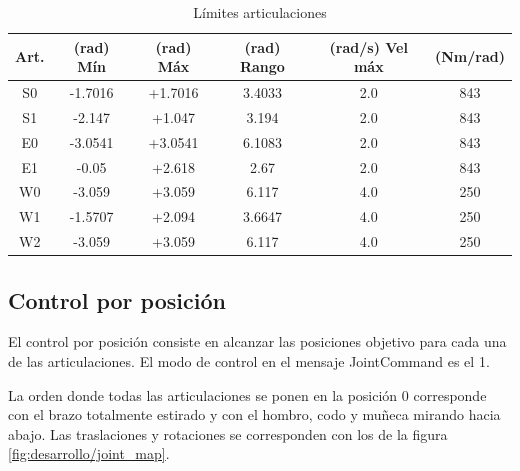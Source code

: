 \begin{table}[]
\centering
\caption{Límites articulaciones}
\label{tab:desarrollo/limits}
\begin{tabular}{cccccc}
Art.                    & (rad) Mín & (rad) Máx & (rad) Rango & (rad/s) Vel máx & (Nm/rad) \\ \hline
\multicolumn{1}{c|}{S0} & -1.7016   & +1.7016   & 3.4033      & 2.0             & 843      \\
\multicolumn{1}{c|}{S1} & -2.147    & +1.047    & 3.194       & 2.0             & 843      \\
\multicolumn{1}{c|}{E0} & -3.0541   & +3.0541   & 6.1083      & 2.0             & 843      \\
\multicolumn{1}{c|}{E1} & -0.05     & +2.618    & 2.67        & 2.0             & 843      \\
\multicolumn{1}{c|}{W0} & -3.059    & +3.059    & 6.117       & 4.0             & 250      \\
\multicolumn{1}{c|}{W1} & -1.5707   & +2.094    & 3.6647      & 4.0             & 250      \\
\multicolumn{1}{c|}{W2} & -3.059    & +3.059    & 6.117       & 4.0             & 250     
\end{tabular}
\end{table}

\subsection{Control por posición}
El control por posición consiste en alcanzar las posiciones objetivo para cada una de las articulaciones. El modo de control en el mensaje JointCommand es el 1.

La orden donde todas las articulaciones se ponen en la posición 0 corresponde con el brazo totalmente estirado y con el hombro, codo y muñeca mirando hacia abajo. Las traslaciones y rotaciones se corresponden con los de la figura \ref{fig:desarrollo/joint_map}.

